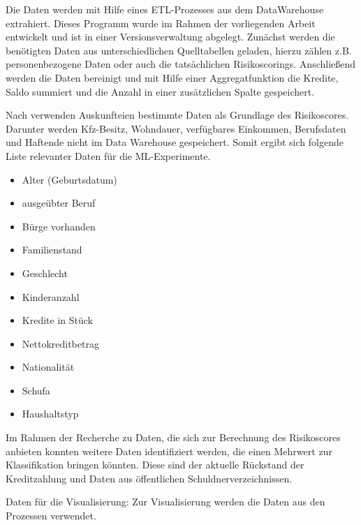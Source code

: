 Die Daten werden mit Hilfe eines ETL-Prozesses aus dem DataWarehouse extrahiert. 
Dieses Programm wurde im Rahmen der vorliegenden Arbeit entwickelt und ist in einer Versionsverwaltung abgelegt. 
Zunächst werden die benötigten Daten aus unterschiedlichen Quelltabellen %
geladen, hierzu zählen z.B. personenbezogene Daten oder auch die tatsächlichen Risikoscorings. 
Anschließend werden die Daten bereinigt und mit Hilfe einer Aggregatfunktion die Kredite, Saldo summiert und die Anzahl in einer zusätzlichen Spalte gespeichert.


Nach \cite{sokol2005} verwenden Auskunfteien bestimmte Daten als Grundlage des Risikoscores. 
Darunter werden Kfz-Besitz, Wohndauer, verfügbares Einkommen, Berufsdaten und Haftende nicht im Data Warehouse gespeichert. 
Somit ergibt sich folgende Liste relevanter Daten für die ML-Experimente. 

\begin{itemize}
 \item Alter (Geburtsdatum)
 \item ausgeübter Beruf
 \item Bürge vorhanden
 \item Familienstand
 \item Geschlecht
 \item Kinderanzahl
 \item Kredite in Stück 
 \item Nettokreditbetrag 
 \item Nationalität
 \item Schufa
 \item Haushaltstyp
\end{itemize}


Im Rahmen der Recherche zu Daten, die sich zur Berechnung des Risikoscores anbieten konnten weitere Daten identifiziert werden, die einen Mehrwert zur Klassifikation bringen könnten. 
Diese sind der aktuelle Rückstand der Kreditzahlung und Daten aus öffentlichen Schuldnerverzeichnissen.








Daten für die Visualisierung:
Zur Visualisierung werden die Daten aus den Prozessen verwendet. 



